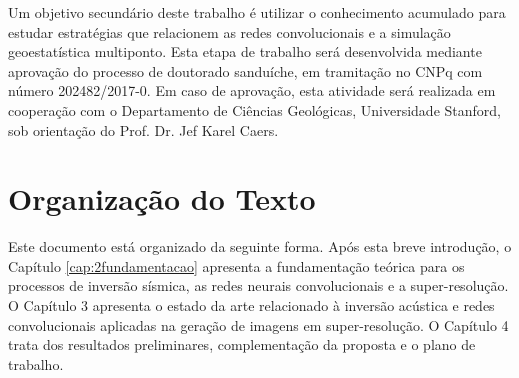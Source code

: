 Um objetivo secundário deste trabalho é utilizar o conhecimento acumulado para estudar estratégias que
relacionem as redes convolucionais e a simulação geoestatística multiponto. Esta etapa de trabalho será desenvolvida
mediante aprovação do processo de doutorado sanduíche, em tramitação no CNPq com número 202482/2017-0.
Em caso de aprovação, esta atividade será realizada em cooperação com o Departamento
de Ciências Geológicas, Universidade Stanford, sob orientação do Prof. Dr. Jef Karel Caers.

\section{Organização do Texto}

Este documento está organizado da seguinte forma. Após esta breve introdução, o
Capítulo \ref{cap:2fundamentacao} apresenta a fundamentação teórica para os
processos de inversão sísmica, as redes neurais 
convolucionais e a super-resolução. O Capítulo 3%
apresenta o estado da arte relacionado à inversão acústica  e
redes convolucionais aplicadas na geração de imagens em super-resolução. 
O Capítulo 4 %
trata dos resultados preliminares, complementação da proposta e o plano de trabalho.

